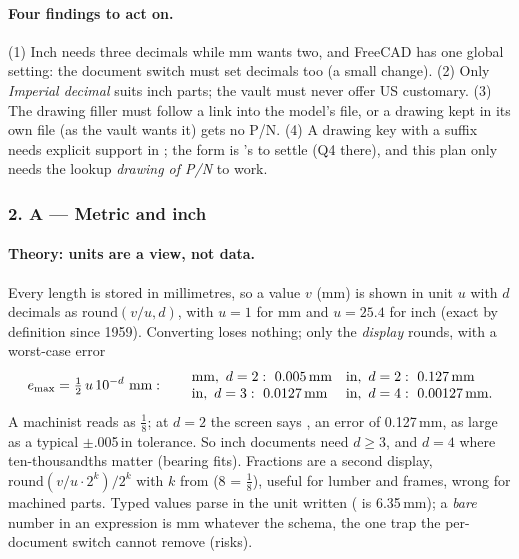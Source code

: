 \paragraph{Four findings to act on.} (1) Inch needs three decimals while mm wants two, and FreeCAD has one global
setting: the document switch must set decimals too (a small \code{[BW]} change). (2) Only \emph{Imperial decimal} suits
inch parts; the vault must never offer US customary. (3) The drawing filler must follow a link into the model's file,
or a drawing kept in its own file (as the vault wants it) gets no P/N. (4) A drawing key with a suffix needs explicit
support in ; the form is 's to settle (Q4 there), and this plan only needs the
lookup \emph{drawing of P/N} to work.

\subsubsection*{2. A --- Metric and inch}

\paragraph{Theory: units are a view, not data.} Every length is stored in millimetres, so a value $v$ (mm) is shown in
unit $u$ with $d$ decimals as $\mathrm{round}(v/u, d)$, with $u = 1$ for mm and $u = 25.4$ for inch (exact by
definition since 1959). Converting loses nothing; only the \emph{display} rounds, with a worst-case error
\[
  e_{\max} = \tfrac12\, u\, 10^{-d}\ \text{mm}:
  \qquad
  \begin{array}{@{}l@{\quad}l@{}}
  \text{mm},\ d=2:\ 0.005\,\text{mm} & \text{in},\ d=2:\ 0.127\,\text{mm}\\
  \text{in},\ d=3:\ 0.0127\,\text{mm} & \text{in},\ d=4:\ 0.00127\,\text{mm}.
  \end{array}
\]
A machinist reads  as $\tfrac18$; at $d=2$ the screen says , an error of 0.127\,mm, as large as
a typical $\pm$.005\,in tolerance. So inch documents need $d \ge 3$, and $d = 4$ where ten-thousandths matter (bearing
fits). Fractions are a second display, $\mathrm{round}(v/u \cdot 2^k)/2^k$ with $k$ from  (8 = $\tfrac18$),
useful for lumber and frames, wrong for machined parts. Typed values parse in the unit written ( is
6.35\,mm); a \emph{bare} number in an expression is mm whatever the schema, the one trap the per-document switch
cannot remove (risks).


